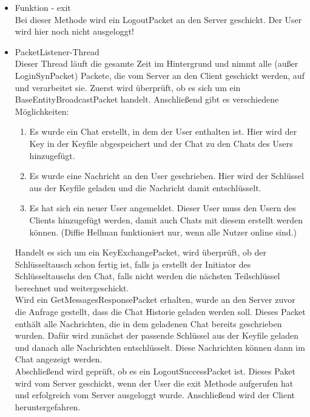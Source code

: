 \begin{itemize}
    
    \item Funktion - exit \\
    Bei dieser Methode wird ein LogoutPacket an den Server geschickt. Der User wird hier noch nicht ausgeloggt!
    
    \item PacketListener-Thread \\
    Dieser Thread läuft die gesamte Zeit im Hintergrund und nimmt alle (außer LoginSynPacket) Packete, die vom Server
    an den Client geschickt werden, auf und verarbeitet sie.
    Zuerst wird überprüft, ob es sich um ein BaseEntityBroadcastPacket handelt. Anschließend gibt es verschiedene Möglichkeiten: \\
    \begin{enumerate}
        \item Es wurde ein Chat erstellt, in dem der User enthalten ist. Hier wird der Key in der Keyfile abgespeichert
        und der Chat zu den Chats des Users hinzugefügt.
        \item Es wurde eine Nachricht an den User geschrieben. Hier wird der Schlüssel aus der Keyfile geladen und die
        Nachricht damit entschlüsselt.
        \item Es hat sich ein neuer User angemeldet. Dieser User muss den Usern des Clients hinzugefügt werden, damit auch
        Chats mit diesem erstellt werden können. (Diffie Hellman funktioniert nur, wenn alle Nutzer online sind.)
    \end{enumerate}
    
    Handelt es sich um ein KeyExchangePacket, wird überprüft, ob der Schlüsseltausch schon fertig ist,
    falls ja erstellt der Initiator des Schlüsseltauschs den Chat, falls nicht werden die nächsten
    Teilschlüssel berechnet und weitergeschickt.\\
    
    Wird ein GetMessagesResponsePacket erhalten, wurde an den Server zuvor die Anfrage gestellt, dass die Chat Historie
    geladen werden soll. Dieses Packet enthält alle Nachrichten, die in dem geladenen Chat bereits geschrieben wurden.
    Dafür wird zunächst der passende Schlüssel aus der Keyfile geladen und danach alle Nachrichten entschlüsselt.
    Diese Nachrichten können dann im Chat angezeigt werden.\\
    
    Abschließend wird geprüft, ob es ein LogoutSuccessPacket ist. Dieses Paket wird vom Server geschickt, wenn der
    User die exit Methode aufgerufen hat und erfolgreich vom Server ausgeloggt wurde. Anschließend wird der Client
    heruntergefahren.\\
    

\end{itemize}
